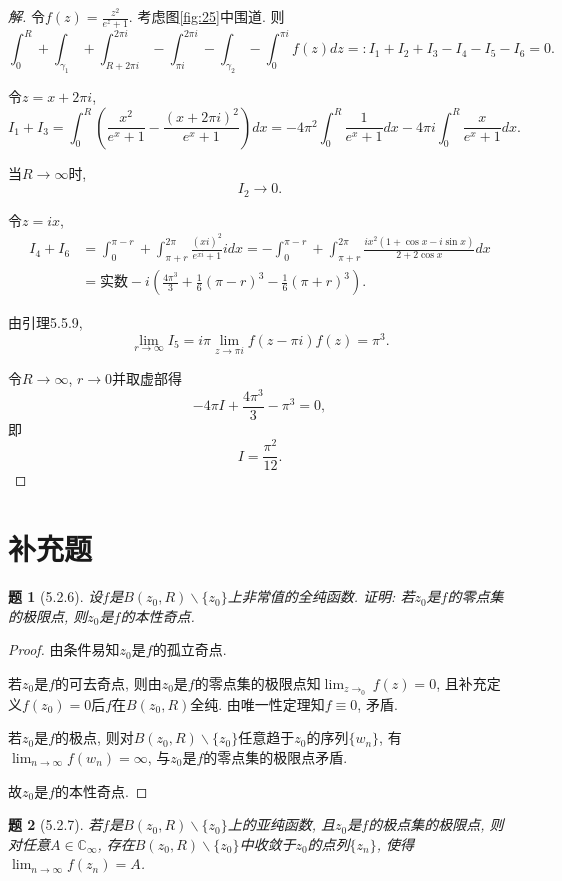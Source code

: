 \documentclass{article}[a4paper, 12pt]
\theoremstyle{mystyle}
\newtheorem{problem}{题}
\newenvironment{solution}{\begin{proof}[解]}{\end{proof}}
\begin{document}
\begin{solution}
  令\(f(z)=\frac{z^2}{e^z+1}\). 考虑图\ref{fig:25}中围道. 则\[\int_{0}^{R}+\int_{\gamma_1}+\int_{R+2\pi i}^{2\pi i}-\int_{\pi i}^{2\pi i}-\int_{\gamma_2}-\int_{0}^{\pi i} f(z)dz=:I_1+I_2+I_3-I_4-I_5-I_6=0.\]

  令\(z=x+2\pi i\), \[I_1+I_3=\int_0^R\left(\frac{x^2}{e^x+1}-\frac{(x+2\pi i)^2}{e^x+1}\right)dx=-4\pi^2\int_0^R\frac{1}{e^x+1}dx-4\pi i\int_0^R \frac{x}{e^x+1}dx.\]

  当\(R\to\infty\)时, \[I_2\to 0.\]

  令\(z=ix\), \begin{align*}I_4+I_6&=\int_{0}^{\pi-r}+\int_{\pi+r}^{2\pi} \frac{(xi)^2}{e^{xi}+1}idx=-\int_{0}^{\pi-r}+\int_{\pi+r}^{2\pi}\frac{ix^2(1+\cos x-i\sin x)}{2+2\cos x}dx\\&=\text{实数}-i\left(\frac{4\pi^3}{3}+\frac{1}{6}(\pi-r)^3-\frac{1}{6}(\pi+r)^3\right).\end{align*}

  由引理5.5.9, \[\lim_{r\to\infty}I_5=i\pi\lim_{z\to\pi i}f(z-\pi i)f(z)=\pi^3.\]

  令\(R\to\infty\), \(r\to0\)并取虚部得\[-4\pi I+\frac{4\pi^3}{3}-\pi^3=0,\]
  即\[I=\frac{\pi^2}{12}. \tag*{\(\qed\)}\]
  \renewcommand{\qedsymbol}{}
\end{solution}

\section{补充题}

\begin{problem}[5.2.6]
  设\(f\)是\(B(z_0,R)\backslash\{z_0\}\)上非常值的全纯函数. 证明: 若\(z_0\)是\(f\)的零点集的极限点, 则\(z_0\)是\(f\)的本性奇点.
\end{problem}

\begin{proof}
  由条件易知\(z_0\)是\(f\)的孤立奇点.
  
  若\(z_0\)是\(f\)的可去奇点, 则由\(z_0\)是\(f\)的零点集的极限点知\(\lim_{z\to _0}f(z)=0\), 且补充定义\(f(z_0)=0\)后\(f\)在\(B(z_0,R)\)全纯. 由唯一性定理知\(f\equiv0\), 矛盾.
  
  若\(z_0\)是\(f\)的极点, 则对\(B(z_0,R)\backslash\{z_0\}\)任意趋于\(z_0\)的序列\(\{w_n\}\), 有\(\lim_{n\to\infty}f(w_n)=\infty\), 与\(z_0\)是\(f\)的零点集的极限点矛盾.
  
  故\(z_0\)是\(f\)的本性奇点.
\end{proof}

\begin{problem}[5.2.7]
  若\(f\)是\(B(z_0,R)\backslash\{z_0\}\)上的亚纯函数, 且\(z_0\)是\(f\)的极点集的极限点, 则对任意\(A\in\mathbb{C}_\infty\), 存在\(B(z_0,R)\backslash\{z_0\}\)中收敛于\(z_0\)的点列\(\{z_n\}\), 使得\(\lim_{n\to\infty}f(z_n)=A\).
\end{problem}
\end{document}
